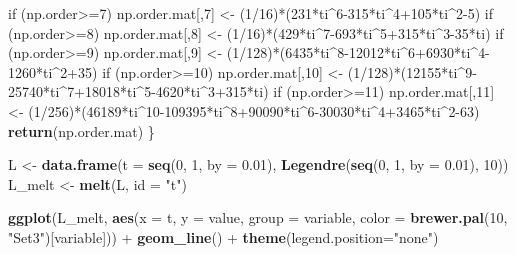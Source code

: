 \documentclass[11pt,]{book}
\newenvironment{Shaded}{\begin{snugshade}}{\end{snugshade}}
\newcommand{\KeywordTok}[1]{\textcolor[rgb]{0.13,0.29,0.53}{\textbf{{#1}}}}
\newcommand{\DataTypeTok}[1]{\textcolor[rgb]{0.13,0.29,0.53}{{#1}}}
\newcommand{\DecValTok}[1]{\textcolor[rgb]{0.00,0.00,0.81}{{#1}}}
\newcommand{\FloatTok}[1]{\textcolor[rgb]{0.00,0.00,0.81}{{#1}}}
\newcommand{\StringTok}[1]{\textcolor[rgb]{0.31,0.60,0.02}{{#1}}}
\newcommand{\NormalTok}[1]{{#1}}
\theoremstyle{definition}
\theoremstyle{definition}
\theoremstyle{remark}
\begin{document}
\begin{Shaded}
\begin{Highlighting}[]
  \NormalTok{if (np.order>=}\DecValTok{7}\NormalTok{)}
    \NormalTok{np.order.mat[,}\DecValTok{7}\NormalTok{] <-}\StringTok{ }\NormalTok{(}\DecValTok{1}\NormalTok{/}\DecValTok{16}\NormalTok{)*(}\DecValTok{231}\NormalTok{*ti^}\DecValTok{6-315}\NormalTok{*ti^}\DecValTok{4+105}\NormalTok{*ti^}\DecValTok{2-5}\NormalTok{)}
  \NormalTok{if (np.order>=}\DecValTok{8}\NormalTok{)}
    \NormalTok{np.order.mat[,}\DecValTok{8}\NormalTok{] <-}\StringTok{ }\NormalTok{(}\DecValTok{1}\NormalTok{/}\DecValTok{16}\NormalTok{)*(}\DecValTok{429}\NormalTok{*ti^}\DecValTok{7-693}\NormalTok{*ti^}\DecValTok{5+315}\NormalTok{*ti^}\DecValTok{3-35}\NormalTok{*ti)}
  \NormalTok{if (np.order>=}\DecValTok{9}\NormalTok{)}
    \NormalTok{np.order.mat[,}\DecValTok{9}\NormalTok{] <-}\StringTok{ }\NormalTok{(}\DecValTok{1}\NormalTok{/}\DecValTok{128}\NormalTok{)*(}\DecValTok{6435}\NormalTok{*ti^}\DecValTok{8-12012}\NormalTok{*ti^}\DecValTok{6+6930}\NormalTok{*ti^}\DecValTok{4-1260}\NormalTok{*ti^}\DecValTok{2+35}\NormalTok{)}
  \NormalTok{if (np.order>=}\DecValTok{10}\NormalTok{)}
    \NormalTok{np.order.mat[,}\DecValTok{10}\NormalTok{] <-}\StringTok{ }\NormalTok{(}\DecValTok{1}\NormalTok{/}\DecValTok{128}\NormalTok{)*(}\DecValTok{12155}\NormalTok{*ti^}\DecValTok{9-25740}\NormalTok{*ti^}\DecValTok{7+18018}\NormalTok{*ti^}\DecValTok{5-4620}\NormalTok{*ti^}\DecValTok{3+315}\NormalTok{*ti)}
  \NormalTok{if (np.order>=}\DecValTok{11}\NormalTok{)}
    \NormalTok{np.order.mat[,}\DecValTok{11}\NormalTok{] <-}\StringTok{ }\NormalTok{(}\DecValTok{1}\NormalTok{/}\DecValTok{256}\NormalTok{)*(}\DecValTok{46189}\NormalTok{*ti^}\DecValTok{10-109395}\NormalTok{*ti^}\DecValTok{8+90090}\NormalTok{*ti^}\DecValTok{6-30030}\NormalTok{*ti^}\DecValTok{4+3465}\NormalTok{*ti^}\DecValTok{2-63}\NormalTok{)}
  \KeywordTok{return}\NormalTok{(np.order.mat)}
\NormalTok{\}}

\NormalTok{L <-}\StringTok{ }\KeywordTok{data.frame}\NormalTok{(}\DataTypeTok{t =} \KeywordTok{seq}\NormalTok{(}\DecValTok{0}\NormalTok{, }\DecValTok{1}\NormalTok{, }\DataTypeTok{by =} \FloatTok{0.01}\NormalTok{), }\KeywordTok{Legendre}\NormalTok{(}\KeywordTok{seq}\NormalTok{(}\DecValTok{0}\NormalTok{, }\DecValTok{1}\NormalTok{, }\DataTypeTok{by =} \FloatTok{0.01}\NormalTok{), }\DecValTok{10}\NormalTok{))}
\NormalTok{L_melt <-}\StringTok{ }\KeywordTok{melt}\NormalTok{(L, }\DataTypeTok{id =} \StringTok{"t"}\NormalTok{)}

\KeywordTok{ggplot}\NormalTok{(L_melt, }\KeywordTok{aes}\NormalTok{(}\DataTypeTok{x =} \NormalTok{t, }\DataTypeTok{y =} \NormalTok{value, }\DataTypeTok{group =} \NormalTok{variable, }\DataTypeTok{color =} \KeywordTok{brewer.pal}\NormalTok{(}\DecValTok{10}\NormalTok{, }\StringTok{"Set3"}\NormalTok{)[variable])) +}\StringTok{ }
\StringTok{  }\KeywordTok{geom_line}\NormalTok{() +}\StringTok{ }\KeywordTok{theme}\NormalTok{(}\DataTypeTok{legend.position=}\StringTok{"none"}\NormalTok{)}
\end{Highlighting}
\end{Shaded}
\end{document}
